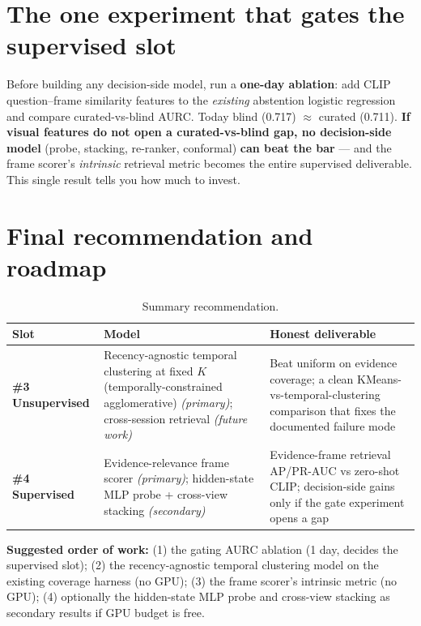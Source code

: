 \documentclass[11pt]{article}
\begin{document}
\section{The one experiment that gates the supervised slot}
Before building any decision-side model, run a \textbf{one-day ablation}: add CLIP question--frame similarity features to the \emph{existing} abstention logistic regression and compare curated-vs-blind AURC. Today blind (0.717) $\approx$ curated (0.711). \textbf{If visual features do not open a curated-vs-blind gap, no decision-side model} (probe, stacking, re-ranker, conformal) \textbf{can beat the bar} --- and the frame scorer's \emph{intrinsic} retrieval metric becomes the entire supervised deliverable. This single result tells you how much to invest.

\section{Final recommendation and roadmap}
\begin{table}[h]\centering\small
\caption{Summary recommendation.}
\begin{tabular}{p{2.3cm}p{5.2cm}p{6.5cm}}
\toprule
Slot & Model & Honest deliverable \\
\midrule
\textbf{\#3 Unsupervised} & Recency-agnostic temporal clustering at fixed $K$ (temporally-constrained agglomerative) \emph{(primary)}; cross-session retrieval \emph{(future work)} & Beat uniform on evidence coverage; a clean KMeans-vs-temporal-clustering comparison that fixes the documented failure mode \\
\textbf{\#4 Supervised} & Evidence-relevance frame scorer \emph{(primary)}; hidden-state MLP probe + cross-view stacking \emph{(secondary)} & Evidence-frame retrieval AP/PR-AUC vs zero-shot CLIP; decision-side gains only if the gate experiment opens a gap \\
\bottomrule
\end{tabular}
\end{table}

\noindent\textbf{Suggested order of work:} (1) the gating AURC ablation (1 day, decides the supervised slot); (2) the recency-agnostic temporal clustering model on the existing coverage harness (no GPU); (3) the frame scorer's intrinsic metric (no GPU); (4) optionally the hidden-state MLP probe and cross-view stacking as secondary results if GPU budget is free.
\end{document}
